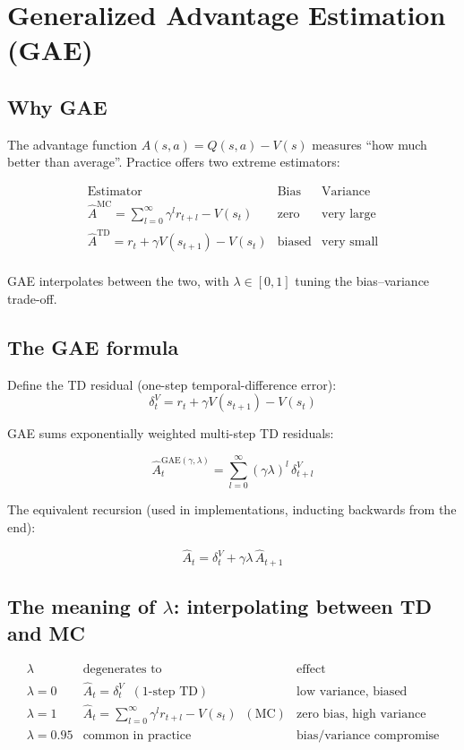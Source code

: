 \documentclass{article}
\begin{document}
\section*{Generalized Advantage Estimation (GAE)}

\subsection*{Why GAE}

The advantage function $A(s,a) = Q(s,a) - V(s)$ measures ``how much better than average''. Practice offers two extreme estimators:

\[
\begin{array}{c|c|c}
\text{Estimator} & \text{Bias} & \text{Variance} \\
\hline
\hat{A}^{\text{MC}} = \displaystyle\sum_{l=0}^{\infty}\gamma^l r_{t+l} - V(s_t) & \text{zero} & \text{very large} \\[6pt]
\hat{A}^{\text{TD}} = r_t + \gamma V(s_{t+1}) - V(s_t) & \text{biased} & \text{very small} \\
\end{array}
\]

GAE interpolates between the two, with $\lambda \in [0,1]$ tuning the bias--variance trade-off.

\subsection*{The GAE formula}

Define the TD residual (one-step temporal-difference error):
\[
\delta_t^V = r_t + \gamma V(s_{t+1}) - V(s_t)
\]

GAE sums exponentially weighted multi-step TD residuals:

\[
\boxed{\hat{A}_t^{\text{GAE}(\gamma,\lambda)} = \sum_{l=0}^{\infty}(\gamma\lambda)^l\,\delta_{t+l}^V}
\]

The equivalent recursion (used in implementations, inducting backwards from the end):

\[
\hat{A}_t = \delta_t^V + \gamma\lambda\,\hat{A}_{t+1}
\]

\subsection*{The meaning of $\lambda$: interpolating between TD and MC}

\[
\begin{array}{c|c|c}
\lambda & \text{degenerates to} & \text{effect} \\
\hline
\lambda = 0 & \hat{A}_t = \delta_t^V \;\;(\text{1-step TD}) & \text{low variance, biased} \\[4pt]
\lambda = 1 & \hat{A}_t = \displaystyle\sum_{l=0}^{\infty}\gamma^l r_{t+l} - V(s_t)\;\;(\text{MC}) & \text{zero bias, high variance} \\[6pt]
\lambda = 0.95 & \text{common in practice} & \text{bias/variance compromise} \\
\end{array}
\]
\end{document}
